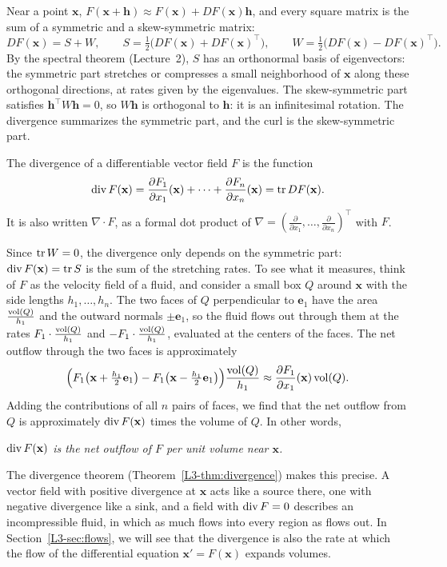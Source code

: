 Near a point $\mathbf{x}$, $F(\mathbf{x} + \mathbf{h}) \approx F(\mathbf{x}) + DF(\mathbf{x})\mathbf{h}$, and every square matrix is the sum of a symmetric and a skew-symmetric matrix:
\[DF(\mathbf{x}) = S + W, \qquad S = \tfrac{1}{2}\big(DF(\mathbf{x}) + DF(\mathbf{x})^\top\big), \qquad W = \tfrac{1}{2}\big(DF(\mathbf{x}) - DF(\mathbf{x})^\top\big).\]
By the spectral theorem (Lecture~2), $S$ has an orthonormal basis of eigenvectors: the symmetric part stretches or compresses a small neighborhood of $\mathbf{x}$ along these orthogonal directions, at rates given by the eigenvalues. The skew-symmetric part satisfies $\mathbf{h}^\top W\mathbf{h} = 0$, so $W\mathbf{h}$ is orthogonal to $\mathbf{h}$: it is an infinitesimal rotation. The divergence summarizes the symmetric part, and the curl is the skew-symmetric part.

\begin{definition}[Divergence]\label{L3-def:divergence}
    The divergence of a differentiable vector field $F$ is the function
    \[\operatorname{div} F(\mathbf{x}) = \frac{\partial F_1}{\partial x_1}(\mathbf{x}) + \cdots + \frac{\partial F_n}{\partial x_n}(\mathbf{x}) = \operatorname{tr} DF(\mathbf{x}).\]
    It is also written $\nabla \cdot F$, as a formal dot product of $\nabla = (\frac{\partial}{\partial x_1}, \ldots, \frac{\partial}{\partial x_n})^\top$ with $F$.
\end{definition}

Since $\operatorname{tr} W = 0$, the divergence only depends on the symmetric part: $\operatorname{div} F(\mathbf{x}) = \operatorname{tr} S$ is the sum of the stretching rates. To see what it measures, think of $F$ as the velocity field of a fluid, and consider a small box $Q$ around $\mathbf{x}$ with the side lengths $h_1, \ldots, h_n$. The two faces of $Q$ perpendicular to $\mathbf{e}_1$ have the area $\frac{\operatorname{vol}(Q)}{h_1}$ and the outward normals $\pm\mathbf{e}_1$, so the fluid flows out through them at the rates $F_1 \cdot \frac{\operatorname{vol}(Q)}{h_1}$ and $-F_1 \cdot \frac{\operatorname{vol}(Q)}{h_1}$, evaluated at the centers of the faces. The net outflow through the two faces is approximately
\[\Big(F_1\big(\mathbf{x} + \tfrac{h_1}{2}\mathbf{e}_1\big) - F_1\big(\mathbf{x} - \tfrac{h_1}{2}\mathbf{e}_1\big)\Big)\frac{\operatorname{vol}(Q)}{h_1} \approx \frac{\partial F_1}{\partial x_1}(\mathbf{x})\operatorname{vol}(Q).\]
Adding the contributions of all $n$ pairs of faces, we find that the net outflow from $Q$ is approximately $\operatorname{div} F(\mathbf{x})$ times the volume of $Q$. In other words,
\begin{center}
    \emph{$\operatorname{div} F(\mathbf{x})$ is the net outflow of $F$ per unit volume near $\mathbf{x}$.}
\end{center}
The divergence theorem (Theorem~\ref{L3-thm:divergence}) makes this precise. A vector field with positive divergence at $\mathbf{x}$ acts like a source there, one with negative divergence like a sink, and a field with $\operatorname{div} F = 0$ describes an incompressible fluid, in which as much flows into every region as flows out. In Section~\ref{L3-sec:flows}, we will see that the divergence is also the rate at which the flow of the differential equation $\mathbf{x}' = F(\mathbf{x})$ expands volumes.

